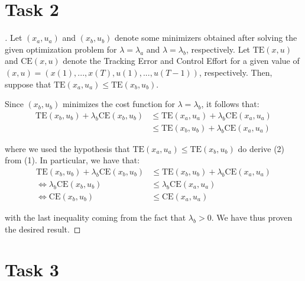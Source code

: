 \documentclass[12pt]{article}
\begin{document}
\section{Task 2}

\begin{proof}[\unskip\nopunct]
    Let $(x_a, u_a)$ and $(x_b, u_b)$ denote some minimizers obtained after solving the given optimization problem for $\lambda = \lambda_{a}$ and $\lambda = \lambda_{b}$, respectively. Let $\text{TE}(x, u)$ and $\text{CE}(x, u)$ denote the Tracking Error and Control Effort for a given value of $(x, u) = (x(1), ..., x(T), u(1), ..., u(T - 1))$, respectively.
    Then, suppose that $\text{TE}(x_a, u_a) \le \text{TE}(x_b, u_b)$.

    Since $(x_b, u_b)$ minimizes the cost function for $\lambda = \lambda_b$, it follows that:
    \vspace{-0.3em}
    \begin{align}
        \text{TE}(x_b, u_b) + \lambda_b \text{CE}(x_b, u_b) & \le 
        \text{TE}(x_a, u_a) + \lambda_b \text{CE}(x_a, u_a) \\
        & \le \text{TE}(x_b, u_b) + \lambda_b \text{CE}(x_a, u_a)
    \end{align}

    where we used the hypothesis that $\text{TE}(x_a, u_a) \le \text{TE}(x_b, u_b)$ do derive (2) from (1). In particular, we have that:
    \vspace{-0.3em}
    \begin{align*}
        \text{TE}(x_b, u_b) + \lambda_b \text{CE}(x_b, u_b) & \le 
        \text{TE}(x_b, u_b) + \lambda_b \text{CE}(x_a, u_a) \\
        \Leftrightarrow \lambda_b \text{CE}(x_b, u_b) & \le 
        \lambda_b \text{CE}(x_a, u_a) \\
        \Leftrightarrow \text{CE}(x_b, u_b) &\le \text{CE}(x_a, u_a)
    \end{align*}

    with the last inequality coming from the fact that $\lambda_b > 0$. We have thus proven the desired result.
\end{proof}

\section{Task 3}
\end{document}
